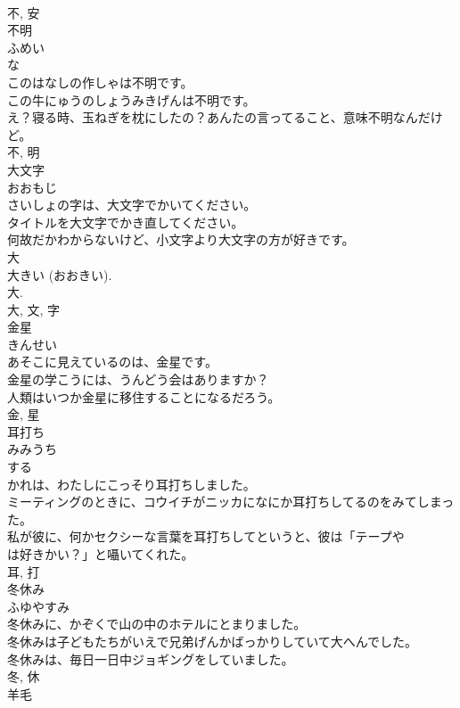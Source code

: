 \documentclass[8pt]{extreport}
\begin{document}
\begin{CJK}{UTF8}{min}
\\	不, 安	
\\	不明	
\\	ふめい	
\\	な 
\\	このはなしの作しゃは不明です。	
\\	この牛にゅうのしょうみきげんは不明です。	
\\	え？寝る時、玉ねぎを枕にしたの？あんたの言ってること、意味不明なんだけど。	
\\	不, 明	
\\	大文字	
\\	おおもじ	
\\	さいしょの字は、大文字でかいてください。	
\\	タイトルを大文字でかき直してください。	
\\	何故だかわからないけど、小文字より大文字の方が好きです。	
\\	大 
\\	大きい (おおきい). 
\\	大. 
\\	大, 文, 字	
\\	金星	
\\	きんせい	
\\	あそこに見えているのは、金星です。	
\\	金星の学こうには、うんどう会はありますか？	
\\	人類はいつか金星に移住することになるだろう。	
\\	金, 星	
\\	耳打ち	
\\	みみうち	
\\	する 
\\	かれは、わたしにこっそり耳打ちしました。	
\\	ミーティングのときに、コウイチがニッカになにか耳打ちしてるのをみてしまった。	
\\	私が彼に、何かセクシーな言葉を耳打ちしてというと、彼は「テープや
\\	は好きかい？」と囁いてくれた。	
\\	耳, 打	
\\	冬休み	
\\	ふゆやすみ	
\\	冬休みに、かぞくで山の中のホテルにとまりました。	
\\	冬休みは子どもたちがいえで兄弟げんかばっかりしていて大へんでした。	
\\	冬休みは、毎日一日中ジョギングをしていました。	
\\	冬, 休	
\\	羊毛	

\end{CJK}
\end{document}
